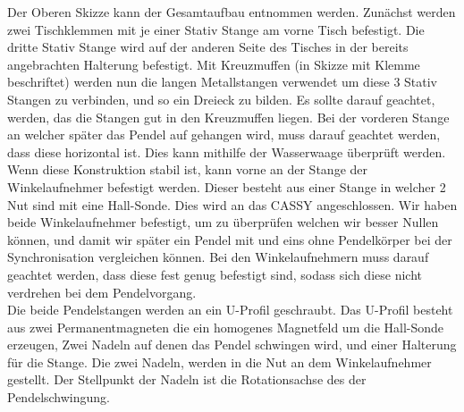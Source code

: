 \documentclass[twoside]{protokoll}
\begin{document}
Der Oberen Skizze kann der Gesamtaufbau entnommen werden. 
Zunächst werden zwei Tischklemmen mit je einer Stativ Stange am vorne Tisch befestigt.
Die dritte Stativ Stange wird auf der anderen Seite des Tisches in der bereits angebrachten Halterung befestigt. 
Mit Kreuzmuffen (in Skizze mit Klemme beschriftet) werden nun die langen Metallstangen verwendet um diese 3 Stativ Stangen zu verbinden, und so ein Dreieck zu bilden.
Es sollte darauf geachtet, werden, das die Stangen gut in den Kreuzmuffen liegen. 
Bei der vorderen Stange an welcher später das Pendel auf gehangen wird, muss darauf geachtet werden, dass diese horizontal ist.
Dies kann mithilfe der Wasserwaage überprüft werden.\\

Wenn diese Konstruktion stabil ist, kann vorne an der Stange der Winkelaufnehmer befestigt werden. 
Dieser besteht aus einer Stange in welcher 2 Nut sind mit eine Hall-Sonde. 
Dies wird an das CASSY angeschlossen.
Wir haben beide Winkelaufnehmer befestigt, um zu überprüfen welchen wir besser Nullen können, und damit wir später ein Pendel mit und eins ohne Pendelkörper bei der Synchronisation vergleichen können.
Bei den Winkelaufnehmern muss darauf geachtet werden, dass diese fest genug befestigt sind, sodass sich diese nicht verdrehen bei dem Pendelvorgang.\\

Die beide Pendelstangen werden an ein U-Profil geschraubt.
Das U-Profil besteht aus zwei Permanentmagneten die ein homogenes Magnetfeld um die Hall-Sonde erzeugen, Zwei Nadeln auf denen das Pendel schwingen wird, und einer Halterung für die Stange. 
Die zwei Nadeln, werden in die Nut an dem Winkelaufnehmer gestellt.
Der Stellpunkt der Nadeln ist die Rotationsachse des der Pendelschwingung. \\
\end{document}
